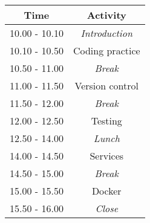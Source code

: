 \begin{tabular}{c|c}

      \textbf{Time} & \textbf{Activity}  \\

      \hline

      10.00 - 10.10 & \emph{Introduction} \\

      \hline

      10.10 - 10.50 & Coding practice \\

      \hline

      10.50 - 11.00 & \emph{Break} \\

      \hline

      11.00 - 11.50 & Version control \\

      \hline

      11.50 - 12.00 & \emph{Break} \\

      \hline

      12.00 - 12.50 & Testing \\

      \hline

      12.50 - 14.00 & \emph{Lunch} \\

      \hline

      14.00 - 14.50 & Services \\

      \hline

      14.50 - 15.00 & \emph{Break} \\

      \hline

      15.00 - 15.50 & Docker \\

      \hline

      15.50 - 16.00 & \emph{Close} \\

      \hline

\end{tabular}
